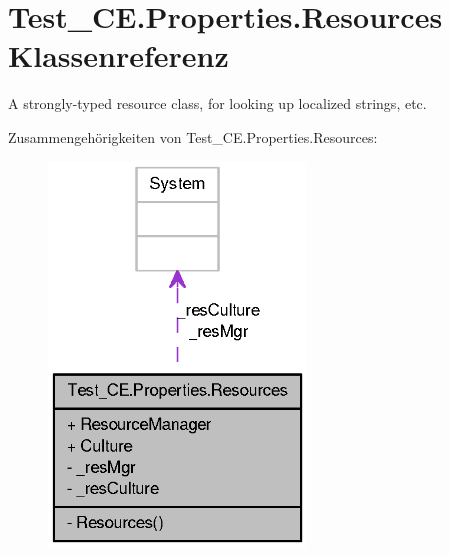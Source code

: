 \hypertarget{class_test___c_e_1_1_properties_1_1_resources}{
\section{Test\_\-CE.Properties.Resources Klassenreferenz}
\label{class_test___c_e_1_1_properties_1_1_resources}
}


A strongly-\/typed resource class, for looking up localized strings, etc.  




Zusammengehörigkeiten von Test\_\-CE.Properties.Resources:\nopagebreak
\begin{figure}[H]
\begin{center}
\leavevmode
\includegraphics[width=194pt]{class_test___c_e_1_1_properties_1_1_resources__coll__graph}
\end{center}
\end{figure}
